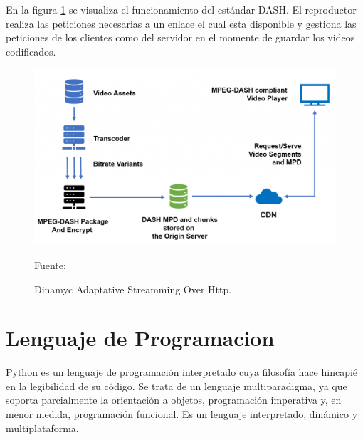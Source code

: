 
En la figura \ref{fig:dash} se visualiza el funcionamiento del estándar DASH. El reproductor realiza las peticiones necesarias a un enlace el cual esta disponible y gestiona las peticiones de los clientes como del servidor en el momente de guardar los videos codificados.\\

\begin{figure}[H]
    \begin{center}
        \includegraphics[width=11.5cm]{img/capitulo_2/dash.png}        
    \end{center}
    \begin{center}
        \caption{Dinamyc Adaptative Streamming Over Http.}
        Fuente: \cite{dash}
        \label{fig:dash}
    \end{center}
\end{figure}

\section{Lenguaje de Programacion}
Python es un lenguaje de programación interpretado cuya filosofía hace hincapié en la legibilidad de su código. Se trata de un lenguaje multiparadigma, ya que soporta parcialmente la orientación a objetos, programación imperativa y, en menor medida, programación funcional. Es un lenguaje interpretado, dinámico y multiplataforma.\\

